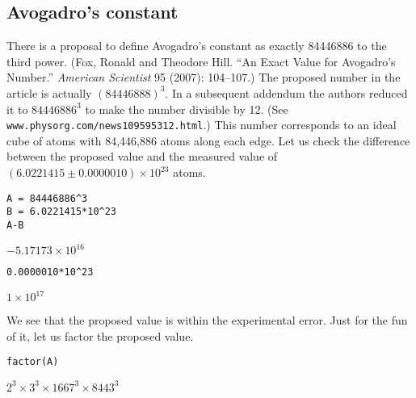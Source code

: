 
\subsection{Avogadro's constant}
There is a proposal to define Avogadro's constant as exactly
84446886 to the third power.
(Fox, Ronald and Theodore Hill.
``An Exact Value for Avogadro's Number.''
{\it American Scientist} 95 (2007): 104--107.)
The proposed number in the article is actually $(84446888)^3$.
In a subsequent addendum the authors reduced it to $84446886^3$ to make the
number divisible by 12. (See {\tt www.physorg.com/news109595312.html}.)
This number corresponds to an ideal cube of atoms with 84,446,886
atoms along each edge.
Let us check the difference between the proposed value and the measured value
of $(6.0221415\pm0.0000010)\times10^{23}$ atoms.

\begin{Verbatim}[formatcom=\color{blue},samepage=true]
A = 84446886^3
B = 6.0221415*10^23
A-B
\end{Verbatim}

$\displaystyle -5.17173\times10^{16}$

\begin{Verbatim}[formatcom=\color{blue},samepage=true]
0.0000010*10^23
\end{Verbatim}

$\displaystyle 1\times10^{17}$

We see that the proposed value is within the experimental error.
Just for the fun of it, let us factor the proposed value.

\begin{Verbatim}[formatcom=\color{blue},samepage=true]
factor(A)
\end{Verbatim}

$\displaystyle 2^3\times3^3\times1667^3\times8443^3$
